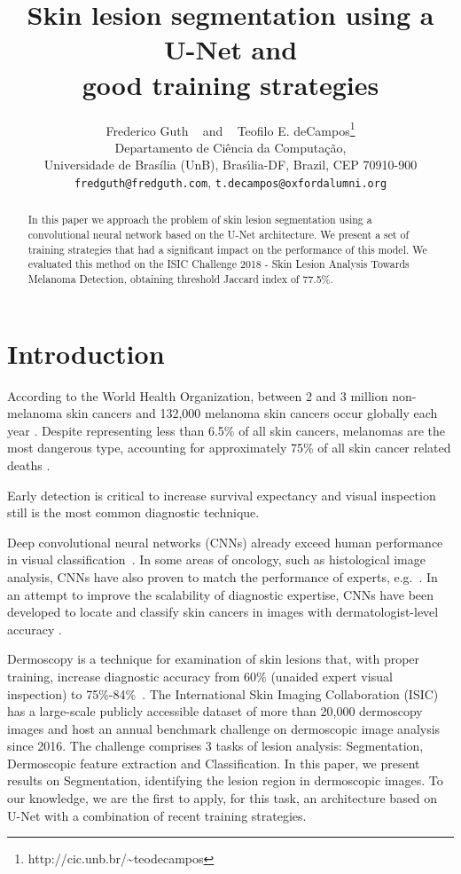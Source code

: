 \documentclass{article}
\title{Skin lesion segmentation using a U-Net and\\
  good training strategies}
\author{
  Frederico Guth ~ and ~ Teofilo E. deCampos\thanks{http://cic.unb.br/\~{}teodecampos}\\
  Departamento de Ciência da Computação,\\
  Universidade de Brasília (UnB), Bras\'{\i}lia-DF, Brazil, CEP 70910-900 \\
  \texttt{fredguth@fredguth.com}, \texttt{t.decampos@oxfordalumni.org}
}
\begin{document}

\maketitle

\begin{abstract}
  In this paper we approach the problem of skin lesion segmentation using a
  convolutional neural network based on the U-Net architecture.
  We present a set of training strategies that had a significant impact
  on the performance of this model.
  We evaluated this method on the ISIC Challenge 2018 - Skin Lesion
  Analysis Towards Melanoma Detection, obtaining threshold Jaccard index of 77.5\%.
\end{abstract}

\section{Introduction}

According to the World Health Organization, between 2 and 3 million
non-melanoma skin cancers and 132,000 melanoma skin cancers occur
globally each year \cite{who}. Despite representing less than 6.5\% of
all skin cancers, melanomas are the most dangerous type, accounting
for approximately 75\% of all skin cancer related deaths
\cite{who,nature}.

Early detection is critical to increase survival expectancy and visual
inspection still is the most common diagnostic technique.

Deep convolutional neural networks (CNNs) already exceed human
performance in visual classification~\cite{fei}.
In some areas of oncology, such as histological image analysis, CNNs
have also proven to match the performance of experts,
e.g.\ \cite{veta_etal_mia2015}.  In an attempt to improve the
scalability of diagnostic expertise, CNNs have been developed to
locate and classify skin cancers in images with dermatologist-level
accuracy \cite{nature}.

Dermoscopy is a technique for examination of skin lesions that, with
proper training, increase diagnostic accuracy from 60\% (unaided expert
visual inspection) to 75\%-84\%~\cite{isic}. The International Skin
Imaging Collaboration (ISIC) has a large-scale publicly accessible
dataset of more than 20,000 dermoscopy images and host an annual
benchmark challenge on dermoscopic image analysis since 2016.  The
challenge comprises 3 tasks of lesion analysis: Segmentation,
Dermoscopic feature extraction and Classification.  In this paper, we
present results on Segmentation, identifying the lesion region in 
dermoscopic images. To our knowledge, we are the first to apply,
for this task, an architecture based on U-Net with a combination
of recent training strategies. 
\end{document}
